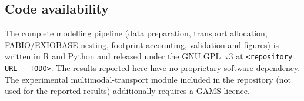 \subsection{Code availability}\label{subsec:code-availability}
The complete modelling pipeline (data preparation, transport allocation,
FABIO/EXIOBASE nesting, footprint accounting, validation and figures) is
written in R and Python and released under the GNU GPL~v3 at
\texttt{<repository URL --- TODO>}. The results reported here have no
proprietary software dependency. The experimental multimodal-transport
module included in the repository (not used for the reported results)
additionally requires a GAMS licence.

